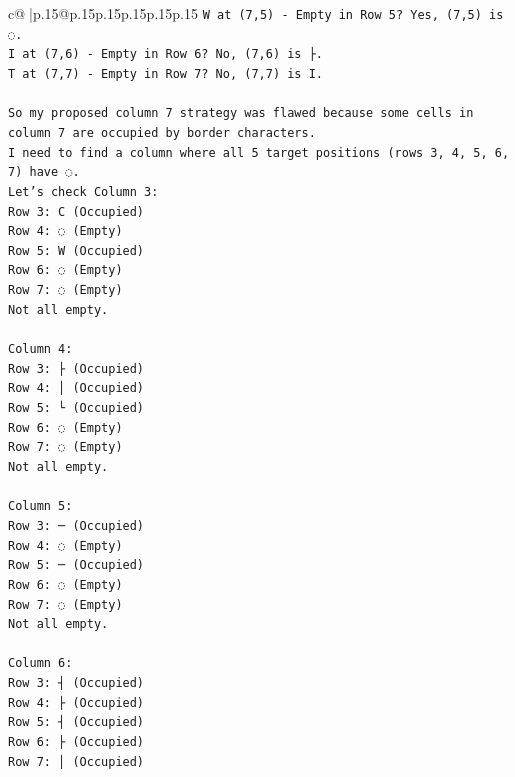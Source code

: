 \documentclass{article}
\begin{document}
{\begin{supertabular}{c@{$\;$}|p{.15\linewidth}@{}p{.15\linewidth}p{.15\linewidth}p{.15\linewidth}p{.15\linewidth}p{.15\linewidth}}
{{{\texttt{W at (7,5) {-} Empty in Row 5? Yes, (7,5) is ◌.} \\
\texttt{I at (7,6) {-} Empty in Row 6? No, (7,6) is ├.} \\
\texttt{T at (7,7) {-} Empty in Row 7? No, (7,7) is I.} \\
\\ 
\texttt{So my proposed column 7 strategy was flawed because some cells in column 7 are occupied by border characters.} \\
\texttt{I need to find a column where all 5 target positions (rows 3, 4, 5, 6, 7) have ◌.} \\
\texttt{Let's check Column 3:} \\
\texttt{Row 3: C (Occupied)} \\
\texttt{Row 4: ◌ (Empty)} \\
\texttt{Row 5: W (Occupied)} \\
\texttt{Row 6: ◌ (Empty)} \\
\texttt{Row 7: ◌ (Empty)} \\
\texttt{Not all empty.} \\
\\ 
\texttt{Column 4:} \\
\texttt{Row 3: ├ (Occupied)} \\
\texttt{Row 4: │ (Occupied)} \\
\texttt{Row 5: └ (Occupied)} \\
\texttt{Row 6: ◌ (Empty)} \\
\texttt{Row 7: ◌ (Empty)} \\
\texttt{Not all empty.} \\
\\ 
\texttt{Column 5:} \\
\texttt{Row 3: ─ (Occupied)} \\
\texttt{Row 4: ◌ (Empty)} \\
\texttt{Row 5: ─ (Occupied)} \\
\texttt{Row 6: ◌ (Empty)} \\
\texttt{Row 7: ◌ (Empty)} \\
\texttt{Not all empty.} \\
\\ 
\texttt{Column 6:} \\
\texttt{Row 3: ┤ (Occupied)} \\
\texttt{Row 4: ├ (Occupied)} \\
\texttt{Row 5: ┤ (Occupied)} \\
\texttt{Row 6: ├ (Occupied)} \\
\texttt{Row 7: │ (Occupied)} \\
}}}
\end{supertabular}}
\end{document}
